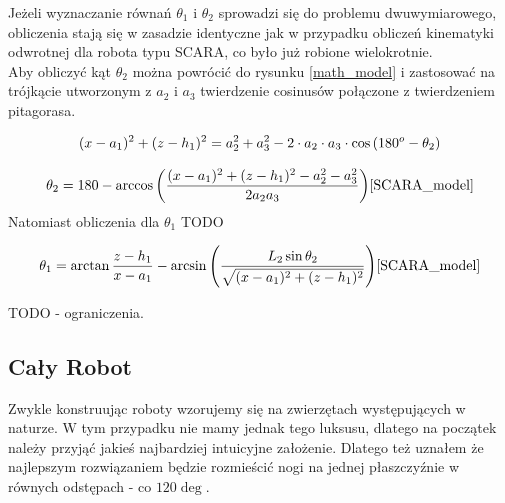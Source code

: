 \documentclass[a4paper,13pt]{article}
\begin{document}


Jeżeli wyznaczanie równań $\theta_1$ i $\theta_2$ sprowadzi się do problemu dwuwymiarowego, obliczenia stają się w zasadzie identyczne jak w przypadku obliczeń kinematyki odwrotnej dla robota typu SCARA, co było już robione wielokrotnie.\\

Aby obliczyć kąt $\theta_2$ można powrócić do rysunku \ref{math_model} i zastosować na trójkącie utworzonym z $a_2$ i $a_3$ twierdzenie cosinusów połączone z twierdzeniem pitagorasa.

\begin{equation}
(x - a_1)^2 + (z - h_1)^2 = a_2^2 + a_3^2 - 2 \cdot a_2 \cdot a_3 \cdot \cos{(180^o - \theta_2)}\\
\end{equation}

\begin{equation}
\theta_2 = 180 - \arccos{\left( \frac{(x - a_1)^2 + (z - h_1)^2 - a_2^2 - a_3^2}{2 a_2 a_3} \right)}\\ \cite{SCARA_model}
\end{equation}
Natomiast obliczenia dla $\theta_1$ TODO

\begin{equation}
\theta_1 = \arctan{\frac{z - h_1}{x - a_1}} - \arcsin{\left( \frac{L_2 \sin{\theta_2} }{ \sqrt{ (x - a_1)^2 + (z - h_1)^2}} \right)}\\ \cite{SCARA_model}
\end{equation} 

TODO - ograniczenia.

\subsection{Cały Robot}
Zwykle konstruując roboty wzorujemy się na zwierzętach występujących w naturze. W tym przypadku nie mamy jednak tego luksusu, dlatego na początek należy przyjąć jakieś najbardziej intuicyjne założenie. Dlatego też uznałem że najlepszym rozwiązaniem będzie rozmieścić nogi na jednej płaszczyźnie w równych odstępach - co $120\deg$.
\end{document}
